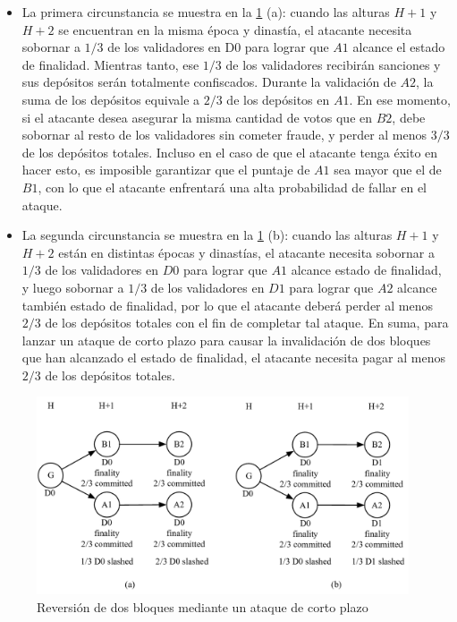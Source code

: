 \begin{itemize}
\item La primera circunstancia se muestra en la \ref{fig:revert2} (a): cuando las alturas $H+1$ y $H+2$ se encuentran en la misma época y dinastía, el atacante necesita sobornar a $1/3$ de los validadores en D0 para lograr que $A1$ alcance el estado de finalidad. Mientras tanto, ese $1/3$ de los validadores recibirán sanciones y sus depósitos serán totalmente confiscados. Durante la validación de $A2$, la suma de los depósitos equivale a $2/3$ de los depósitos en $A1$. En ese momento, si el atacante desea asegurar la misma cantidad de votos que en $B2$, debe sobornar al resto de los validadores sin cometer fraude, y perder al menos $3/3$ de los depósitos totales. Incluso en el caso de que el atacante tenga éxito en hacer esto, es imposible garantizar que el puntaje de $A1$ sea mayor que el de $B1$, con lo que el atacante enfrentará una alta probabilidad de fallar en el ataque.

\item La segunda circunstancia se muestra en la \ref{fig:revert2} (b): cuando las alturas $H+1$ y $H+2$ están en distintas épocas y dinastías, el atacante necesita sobornar a $1/3$ de los validadores en $D0$ para lograr que $A1$ alcance estado de finalidad, y luego sobornar a $1/3$ de los validadores en $D1$ para lograr que $A2$ alcance también estado de finalidad, por lo que el atacante deberá perder al menos $2/3$ de los depósitos totales con el fin de completar tal ataque. En suma, para lanzar un ataque de corto plazo para causar la invalidación de dos bloques que han alcanzado el estado de finalidad, el atacante necesita pagar al menos $2/3$ de los depósitos totales.
\end{itemize}

\begin{figure}[h]
\centering
\includegraphics[width=11cm]{./figs/revert2}
\caption{Reversión de dos bloques mediante un ataque de corto plazo}
\label{fig:revert2}
\end{figure}

